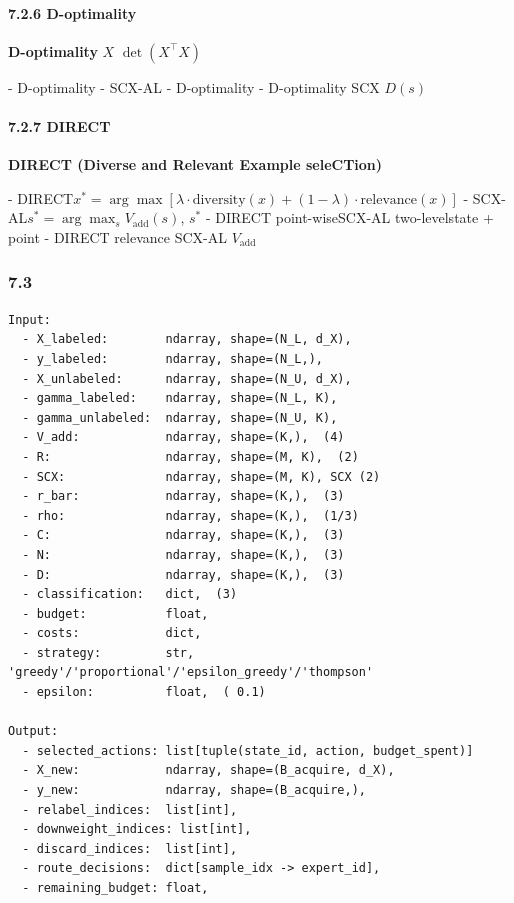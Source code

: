 \documentclass[
  12pt,
]{article}
\begin{document}
\paragraph{7.2.6  D-optimality
}\label{ux4e0e-d-optimality-ux7684ux5bf9ux6bd4}

\textbf{D-optimality} \(X\)  \(\det(X^\top X)\)


\textbf{} - D-optimality  - SCX-AL
 - D-optimality  -
D-optimality  SCX  \(D(s)\) 

\paragraph{7.2.7  DIRECT
}\label{ux4e0e-direct-ux7684ux5bf9ux6bd4}

\textbf{DIRECT (Diverse and Relevant Example
seleCTion)}

\textbf{} -
DIRECT\(x^* = \arg\max [\lambda \cdot \text{diversity}(x) + (1-\lambda) \cdot \text{relevance}(x)]\)
- SCX-AL\(s^* = \arg\max_s V_{\text{add}}(s)\),  \(s^*\)
 - DIRECT  point-wiseSCX-AL  two-levelstate +
point - DIRECT  relevance SCX-AL 
\(V_{\text{add}}\) 

\subsubsection{7.3
}\label{ux8f93ux5165ux8f93ux51faux89c4ux8303-6}

\begin{verbatim}
Input:
  - X_labeled:        ndarray, shape=(N_L, d_X), 
  - y_labeled:        ndarray, shape=(N_L,), 
  - X_unlabeled:      ndarray, shape=(N_U, d_X), 
  - gamma_labeled:    ndarray, shape=(N_L, K), 
  - gamma_unlabeled:  ndarray, shape=(N_U, K), 
  - V_add:            ndarray, shape=(K,),  (4)
  - R:                ndarray, shape=(M, K),  (2)
  - SCX:              ndarray, shape=(M, K), SCX (2)
  - r_bar:            ndarray, shape=(K,),  (3)
  - rho:              ndarray, shape=(K,),  (1/3)
  - C:                ndarray, shape=(K,),  (3)
  - N:                ndarray, shape=(K,),  (3)
  - D:                ndarray, shape=(K,),  (3)
  - classification:   dict,  (3)
  - budget:           float, 
  - costs:            dict, 
  - strategy:         str, 'greedy'/'proportional'/'epsilon_greedy'/'thompson'
  - epsilon:          float,  ( 0.1)

Output:
  - selected_actions: list[tuple(state_id, action, budget_spent)]
  - X_new:            ndarray, shape=(B_acquire, d_X), 
  - y_new:            ndarray, shape=(B_acquire,), 
  - relabel_indices:  list[int], 
  - downweight_indices: list[int], 
  - discard_indices:  list[int], 
  - route_decisions:  dict[sample_idx -> expert_id], 
  - remaining_budget: float, 
\end{verbatim}
\end{document}
